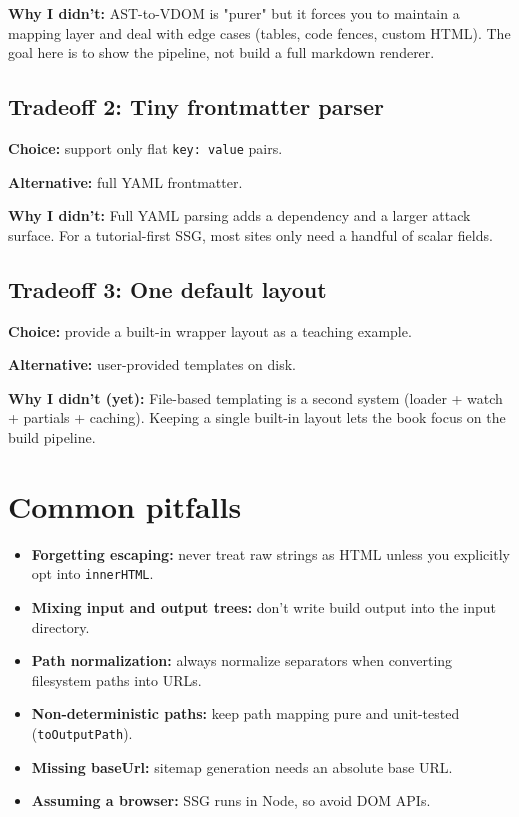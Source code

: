 \textbf{Why I didn't:}
AST-to-VDOM is "purer" but it forces you to maintain a mapping layer and deal with edge cases (tables, code fences, custom HTML).
The goal here is to show the pipeline, not build a full markdown renderer.

\subsection{Tradeoff 2: Tiny frontmatter parser}
\textbf{Choice:} support only flat \texttt{key: value} pairs.

\textbf{Alternative:} full YAML frontmatter.

\textbf{Why I didn't:}
Full YAML parsing adds a dependency and a larger attack surface.
For a tutorial-first SSG, most sites only need a handful of scalar fields.

\subsection{Tradeoff 3: One default layout}
\textbf{Choice:} provide a built-in wrapper layout as a teaching example.

\textbf{Alternative:} user-provided templates on disk.

\textbf{Why I didn't (yet):}
File-based templating is a second system (loader + watch + partials + caching).
Keeping a single built-in layout lets the book focus on the build pipeline.

\section{Common pitfalls}
\begin{itemize}
  \item \textbf{Forgetting escaping:} never treat raw strings as HTML unless you explicitly opt into \texttt{innerHTML}.
  \item \textbf{Mixing input and output trees:} don't write build output into the input directory.
  \item \textbf{Path normalization:} always normalize separators when converting filesystem paths into URLs.
  \item \textbf{Non-deterministic paths:} keep path mapping pure and unit-tested (\texttt{toOutputPath}).
  \item \textbf{Missing baseUrl:} sitemap generation needs an absolute base URL.
  \item \textbf{Assuming a browser:} SSG runs in Node, so avoid DOM APIs.
\end{itemize}

